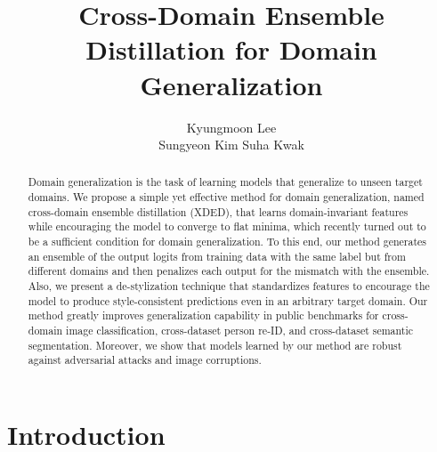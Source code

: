 \documentclass[runningheads]{llncs}
\begin{document}
\pagestyle{headings}
\mainmatter
\def\ECCVSubNumber{4593}  

\title{Cross-Domain Ensemble Distillation \linebreak for Domain Generalization} 

\begin{comment}
\titlerunning{ECCV-22 submission ID \ECCVSubNumber} 
\authorrunning{ECCV-22 submission ID \ECCVSubNumber} 
\author{Anonymous ECCV submission}
\institute{Paper ID \ECCVSubNumber}
\end{comment}


\author{Kyungmoon Lee

 \qquad
Sungyeon Kim \qquad
Suha Kwak}

\maketitle

\begin{abstract}
Domain generalization is the task of learning models that generalize to unseen target domains. We propose a simple yet effective method for domain generalization, named cross-domain ensemble distillation (XDED), that learns domain-invariant features while encouraging the model to converge to flat minima, which recently turned out to be a sufficient condition for domain generalization. To this end, our method generates an ensemble of the output logits from training data with the same label but from different domains and then penalizes each output for the mismatch with the ensemble. Also, we present a de-stylization technique that standardizes features to encourage the model to produce style-consistent predictions even in an arbitrary target domain. Our method greatly improves generalization capability in public benchmarks for cross-domain image classification, cross-dataset person re-ID, and cross-dataset semantic segmentation. Moreover, we show that models learned by our method are robust against adversarial attacks and image corruptions.







\end{abstract} \section{Introduction}
\end{document}
